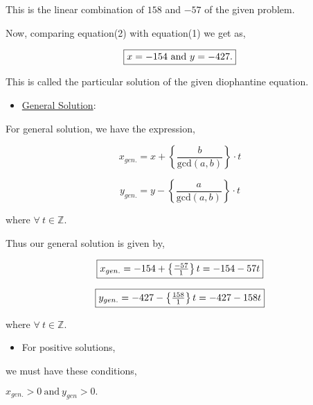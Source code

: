 \documentclass[a4paper,12pt]{article}
\begin{document}
    This is the linear combination of $158$ and $-57$ of the given problem.
    \vspace*{2mm}

    Now, comparing equation(2) with equation(1) we get as, 

    
    \begin{align*}
        \boxed{$$x = -154\  \mbox{and}\  y = -427$$.}
    \end{align*}

    This is called the particular solution of the given diophantine equation.

    \begin{itemize}
        \item \underline{General Solution}:
    \end{itemize}

    For general solution, we have the expression,

   
    $$x_{gen.} = x + \left\{\frac{b}{\mbox{gcd}(a,b)}\right\}\cdot t$$
    

    
    $$y_{gen.} = y - \left\{\frac{a}{\mbox{gcd}(a,b)}\right\}\cdot t$$

    where $\forall\ t\in \mathbb{Z}.$

    \vspace*{2mm}
    

    Thus our general solution is given by,

    \begin{align*}
        \boxed{$$x_{gen.} = -154 + \left\{\frac{-57}{1}\right\}t = -154 - 57t$$} 
    \end{align*}
    
    \begin{align*}
        \boxed{$$y_{gen.} = -427 - \left\{\frac{158}{1}\right\}t = -427 - 158t$$}
    \end{align*}

    where $\forall\ t\in \mathbb{Z}$.

    \begin{itemize}
        \item For positive solutions,
    \end{itemize}
    \begin{center}
        we must have these conditions,
    \end{center}
    \vspace*{0.2cm}
    \begin{center}
        $x_{gen.} > 0\ \mbox{and}\ y_{gen} > 0.$
    \end{center}
\end{document}
